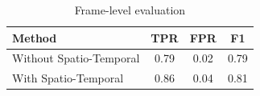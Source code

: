       
    
        \begin{table}
        
            \begin{center}
            
                \begin{tabular}{ l c|c|c| }\\
                    \hline
                        \multicolumn{1}{|l||}{\textbf{Method}} & \textbf{TPR} & \textbf{FPR} & \textbf{F1}\\
                    \hline
                        \multicolumn{1}{|p{2cm}||}{Without Spatio-Temporal} & 0.79 & 0.02 & 0.79 \\
                    \hline
                        \multicolumn{1}{|p{2cm}||}{With Spatio-Temporal} & 0.86 & 0.04 & 0.81 \\
                    \hline
                \end{tabular}
                
                \caption{Frame-level evaluation }
                \label{ResultsFrame}
            
            \end{center}
            
        \end{table}
        
